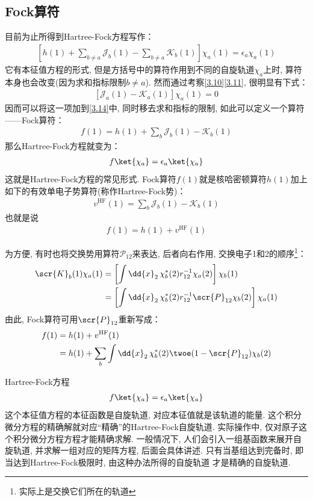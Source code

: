 \subsection{Fock算符}
目前为止所得到Hartree-Fock方程写作：
\begin{align}
	\label{3.14}
	\left[ h(1) + \sum_{b\neq a}\mathscr{J}_b(1) - \sum_{b\neq a}\mathscr{K}_b(1)   \right]\chi_a(1) = \epsilon_a\chi_a(1)
\end{align}
它有本征值方程的形式, 
但是方括号中的算符作用到不同的自旋轨道$\chi_a$上时, 
算符本身也会改变(因为求和指标限制$b\neq a$). 
然而通过考察\autoref{3.10}\autoref{3.11}, 
很明显有下式：
\begin{align}
	\left[ \mathscr{J}_a(1) - \mathscr{K}_a(1)  \right]\chi_a(1) = 0
\end{align}
因而可以将这一项加到\autoref{3.14}中, 
同时移去求和指标的限制, 
如此可以定义一个算符——Fock算符：
\begin{align}
	\label{3.16}
	f(1) = h(1) + \sum_{b}\mathscr{J}_b(1) - \mathscr{K}_b(1)
\end{align}
那么Hartree-Fock方程就变为：
\begin{align}
	\label{3.17}
	f\ket{\chi_a} = \epsilon_a\ket{\chi_a}
\end{align}
这就是Hartree-Fock方程的常见形式. 
Fock算符$f(1)$就是核哈密顿算符$h(1)$加上如下的有效单电子势算符(称作Hartree-Fock势)：
\begin{align}
	\label{3.18}
	v^\mathrm{HF}(1) = \sum_b\mathscr{J}_b(1) - \mathscr{K}_b(1)
\end{align}
也就是说
\begin{align}
	f(1) = h(1) + v^\mathrm{HF}(1)
\end{align}

为方便, 有时也将交换势用算符$\mathscr{P}_{12}$来表达, 后者向右作用, 交换电子1和2的顺序\footnote{实际上是交换它们所在的轨道}：
\begin{align}
	\scr{K}_b(1)\chi_a(1) & = \left[ \int\dd{x}_2\,\chi_b^*(2)r_{12}^{-1}\chi_a(2) \right]\chi_b(1)\notag\\
	& = \left[ \int\dd{x}_2\,\chi_b^*(2)r_{12}^{-1}\scr{P}_{12}\chi_b(2) \right]\chi_a(1)
\end{align}
由此, 
Fock算符可用$\scr{P}_{12}$重新写成：
\begin{align}
	f(1) & = h(1) + v^\mathrm{HF}(1) \notag \\
	& = h(1) + \sum_b\int\dd{x}_2\,\chi_b^*(2)\twoe(1-\scr{P}_{12})\chi_b(2)
\end{align}

Hartree-Fock方程
\begin{align}
	\label{3.22}
	f\ket{\chi_a} = \epsilon_a\ket{\chi_a}
\end{align}
这个本征值方程的本征函数是自旋轨道, 
对应本征值就是该轨道的能量. 
这个积分微分方程的精确解就对应“精确”的Hartree-Fock自旋轨道. 
实际操作中, 
仅对原子这个积分微分方程方程才能精确求解. 
一般情况下, 
人们会引入一组基函数来展开自旋轨道, 
并求解一组对应的矩阵方程, 
后面会具体讲述. 
只有当基组达到完备时, 
即当达到Hartree-Fock极限时, 
由这种办法所得的自旋轨道 才是精确的\hft 自旋轨道.


